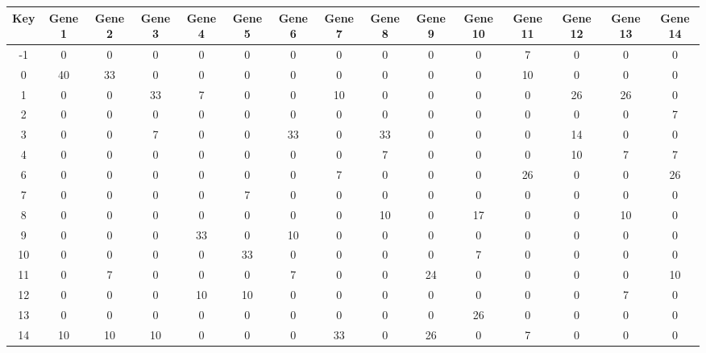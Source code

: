 \begin{tabular}{|c|c|c|c|c|c|c|c|c|c|c|c|c|c|c|}
\hline
Key & Gene 1 & Gene 2 & Gene 3 & Gene 4 & Gene 5 & Gene 6 & Gene 7 & Gene 8 & Gene 9 & Gene 10 & Gene 11 & Gene 12 & Gene 13 & Gene 14 \\
\hline
-1 & 0 & 0 & 0 & 0 & 0 & 0 & 0 & 0 & 0 & 0 & 7 & 0 & 0 & 0 \\
0 & 40 & 33 & 0 & 0 & 0 & 0 & 0 & 0 & 0 & 0 & 10 & 0 & 0 & 0 \\
1 & 0 & 0 & 33 & 7 & 0 & 0 & 10 & 0 & 0 & 0 & 0 & 26 & 26 & 0 \\
2 & 0 & 0 & 0 & 0 & 0 & 0 & 0 & 0 & 0 & 0 & 0 & 0 & 0 & 7 \\
3 & 0 & 0 & 7 & 0 & 0 & 33 & 0 & 33 & 0 & 0 & 0 & 14 & 0 & 0 \\
4 & 0 & 0 & 0 & 0 & 0 & 0 & 0 & 7 & 0 & 0 & 0 & 10 & 7 & 7 \\
6 & 0 & 0 & 0 & 0 & 0 & 0 & 7 & 0 & 0 & 0 & 26 & 0 & 0 & 26 \\
7 & 0 & 0 & 0 & 0 & 7 & 0 & 0 & 0 & 0 & 0 & 0 & 0 & 0 & 0 \\
8 & 0 & 0 & 0 & 0 & 0 & 0 & 0 & 10 & 0 & 17 & 0 & 0 & 10 & 0 \\
9 & 0 & 0 & 0 & 33 & 0 & 10 & 0 & 0 & 0 & 0 & 0 & 0 & 0 & 0 \\
10 & 0 & 0 & 0 & 0 & 33 & 0 & 0 & 0 & 0 & 7 & 0 & 0 & 0 & 0 \\
11 & 0 & 7 & 0 & 0 & 0 & 7 & 0 & 0 & 24 & 0 & 0 & 0 & 0 & 10 \\
12 & 0 & 0 & 0 & 10 & 10 & 0 & 0 & 0 & 0 & 0 & 0 & 0 & 7 & 0 \\
13 & 0 & 0 & 0 & 0 & 0 & 0 & 0 & 0 & 0 & 26 & 0 & 0 & 0 & 0 \\
14 & 10 & 10 & 10 & 0 & 0 & 0 & 33 & 0 & 26 & 0 & 7 & 0 & 0 & 0 \\
\hline
\end{tabular}